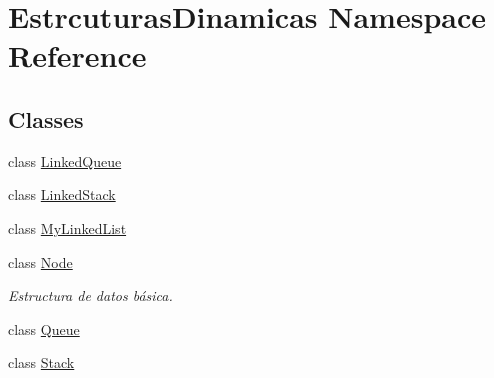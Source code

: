 \hypertarget{namespace_estrcuturas_dinamicas}{}\section{Estrcuturas\+Dinamicas Namespace Reference}
\label{namespace_estrcuturas_dinamicas}
\subsection*{Classes}
\begin{DoxyCompactItemize}
\item 
class \mbox{\hyperlink{class_estrcuturas_dinamicas_1_1_linked_queue}{Linked\+Queue}}
\item 
class \mbox{\hyperlink{class_estrcuturas_dinamicas_1_1_linked_stack}{Linked\+Stack}}
\item 
class \mbox{\hyperlink{class_estrcuturas_dinamicas_1_1_my_linked_list}{My\+Linked\+List}}
\item 
class \mbox{\hyperlink{class_estrcuturas_dinamicas_1_1_node}{Node}}
\begin{DoxyCompactList}\small\item\em Estructura de datos básica. \end{DoxyCompactList}\item 
class \mbox{\hyperlink{class_estrcuturas_dinamicas_1_1_queue}{Queue}}
\item 
class \mbox{\hyperlink{class_estrcuturas_dinamicas_1_1_stack}{Stack}}
\end{DoxyCompactItemize}
